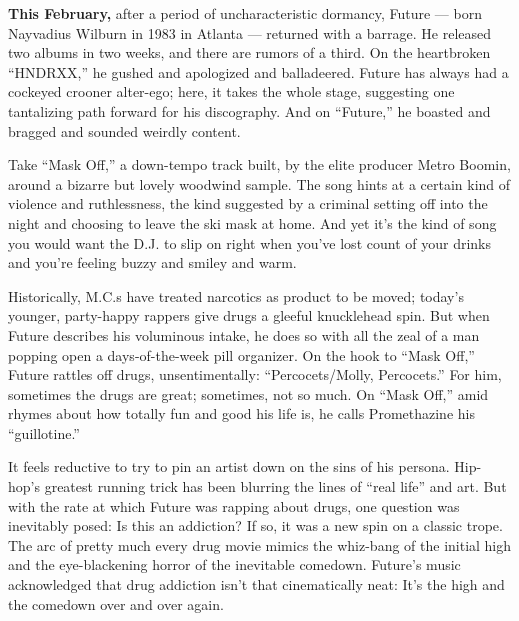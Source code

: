 \textbf{This February,} after a period of uncharacteristic dormancy,
Future --- born Nayvadius Wilburn in 1983 in Atlanta --- returned with a
barrage. He released two albums in two weeks, and there are rumors of a
third. On the heartbroken ``HNDRXX,'' he gushed and apologized and
balladeered. Future has always had a cockeyed crooner alter-ego; here,
it takes the whole stage, suggesting one tantalizing path forward for
his discography. And on ``Future,'' he boasted and bragged and sounded
weirdly content.

Take ``Mask Off,'' a down-tempo track built, by the elite producer Metro
Boomin, around a bizarre but lovely woodwind sample. The song hints at a
certain kind of violence and ruthlessness, the kind suggested by a
criminal setting off into the night and choosing to leave the ski mask
at home. And yet it's the kind of song you would want the D.J. to slip
on right when you've lost count of your drinks and you're feeling buzzy
and smiley and warm.

Historically, M.C.s have treated narcotics as product to be moved;
today's younger, party-happy rappers give drugs a gleeful knucklehead
spin. But when Future describes his voluminous intake, he does so with
all the zeal of a man popping open a days-of-the-week pill organizer. On
the hook to ``Mask Off,'' Future rattles off drugs, unsentimentally:
``Percocets/Molly, Percocets.'' For him, sometimes the drugs are great;
sometimes, not so much. On ``Mask Off,'' amid rhymes about how totally
fun and good his life is, he calls Promethazine his ``guillotine.''

It feels reductive to try to pin an artist down on the sins of his
persona. Hip-hop's greatest running trick has been blurring the lines of
``real life'' and art. But with the rate at which Future was rapping
about drugs, one question was inevitably posed: Is this an addiction? If
so, it was a new spin on a classic trope. The arc of pretty much every
drug movie mimics the whiz-bang of the initial high and the
eye-blackening horror of the inevitable comedown. Future's music
acknowledged that drug addiction isn't that cinematically neat: It's the
high and the comedown over and over again.

\subsection{}

\hypertarget{-1}{%
\paragraph{}\label{-1}}

